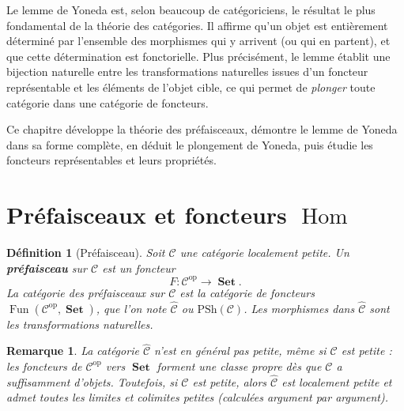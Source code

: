 \documentclass[a4paper,12pt]{book}
\DeclareMathOperator{\Hom}{Hom}
\DeclareMathOperator{\Fun}{Fun}
\DeclareMathOperator{\Set}{\mathbf{Set}}
\newcommand{\op}{\mathrm{op}}
\newtheorem{definition}[theoreme]{Définition}
\newtheorem*{remarque}{Remarque}
\begin{document}
\vspace{1em}

Le lemme de Yoneda est, selon beaucoup de catégoriciens,
le résultat le plus fondamental de la théorie des catégories.
Il affirme qu'un objet est entièrement déterminé
par l'ensemble des morphismes qui y arrivent (ou qui en partent),
et que cette détermination est fonctorielle.
Plus précisément, le lemme établit une bijection naturelle entre les
transformations naturelles issues d'un foncteur représentable et les
éléments de l'objet cible, ce qui permet de \emph{plonger} toute catégorie
dans une catégorie de foncteurs.

Ce chapitre développe la théorie des préfaisceaux, démontre le lemme de Yoneda
dans sa forme complète, en déduit le plongement de Yoneda, puis étudie
les foncteurs représentables et leurs propriétés.


\section{Préfaisceaux et foncteurs \texorpdfstring{$\Hom$}{Hom}}\label{sec:prefaisceaux}

\begin{definition}[Préfaisceau]\label{def:prefaisceau}
Soit $\mathcal{C}$ une catégorie localement petite.
Un \textbf{préfaisceau} sur $\mathcal{C}$ est un foncteur
\[
    F \colon \mathcal{C}^{\op} \longrightarrow \Set.
\]
La catégorie des préfaisceaux sur $\mathcal{C}$ est la catégorie de foncteurs
$\Fun(\mathcal{C}^{\op}, \Set)$,
que l'on note $\widehat{\mathcal{C}}$ ou $\mathrm{PSh}(\mathcal{C})$.
Les morphismes dans $\widehat{\mathcal{C}}$ sont les transformations naturelles.
\end{definition}

\begin{remarque}\label{rem:prefaisceau-taille}
La catégorie $\widehat{\mathcal{C}}$ n'est en général pas petite, même si
$\mathcal{C}$ est petite : les foncteurs de $\mathcal{C}^{\op}$ vers $\Set$
forment une classe propre dès que $\mathcal{C}$ a suffisamment d'objets.
Toutefois, si $\mathcal{C}$ est petite, alors $\widehat{\mathcal{C}}$ est
localement petite et admet toutes les limites et colimites petites
(calculées argument par argument).
\end{remarque}
\end{document}

